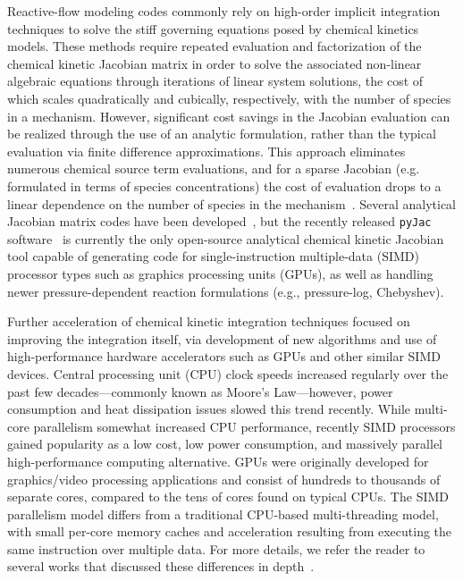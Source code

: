 \documentclass[preprint]{elsarticle}
\begin{document}
Reactive-flow modeling codes commonly rely on high-order implicit integration techniques to solve the stiff governing equations posed by chemical kinetics models.
These methods require repeated evaluation and factorization of the chemical kinetic Jacobian matrix in order to solve the associated non-linear algebraic equations through iterations of linear system solutions, the cost of which scales quadratically and cubically, respectively, with the number of species in a mechanism.
However, significant cost savings in the Jacobian evaluation can be realized through the use of an analytic formulation, rather than the typical evaluation via finite difference approximations.
This approach eliminates numerous chemical source term evaluations, and for a sparse Jacobian (e.g. formulated in terms of species concentrations) the cost of evaluation drops to a linear dependence on the number of species in the mechanism~\cite{Lu:2009gh}.
Several analytical Jacobian matrix codes have been developed~\cite{Safta:2011vn,Youssefi:2011tm,Bisetti:2012jw,Perini:2012gy,Dijkmans:2014bb}, but the recently released \texttt{pyJac} software~\cite{Niemeyer:2015im,Niemeyer:2015ws} is currently the only open-source analytical chemical kinetic Jacobian tool capable of generating code for single-instruction multiple-data (SIMD) processor types such as graphics processing units (GPUs), as well as handling newer pressure-dependent reaction formulations (e.g., pressure-log, Chebyshev).

Further acceleration of chemical kinetic integration techniques focused on improving the integration itself, via development of new algorithms and use of high-performance hardware accelerators such as GPUs and other similar SIMD devices.
Central processing unit (CPU) clock speeds increased regularly over the past few decades---commonly known as Moore's Law---however, power consumption and heat dissipation issues slowed this trend recently.
While multi-core parallelism somewhat increased CPU performance, recently SIMD processors gained popularity as a low cost, low power consumption, and massively parallel high-performance computing alternative.
GPUs were originally developed for graphics\slash video processing applications and consist of hundreds to thousands of separate cores, compared to the tens of cores found on typical CPUs.
The SIMD parallelism model differs from a traditional CPU-based multi-threading model, with small per-core memory caches and acceleration resulting from executing the same instruction over multiple data.
For more details, we refer the reader to several works that discussed these differences in depth~\cite{Cruz:2011gc,Brodtkorb:2013hn,Niemeyer:2014hn}.
\end{document}
